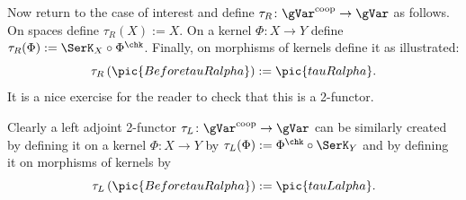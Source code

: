 Now return to the case of interest and define $\tau_R\colon
\gVar^\text{coop}\to \gVar$ as follows.  On spaces define
$\tau_R(X):=X$.  On a kernel $\Phi\colon X\to Y$ define
$\tau_R(\Phi):=\SerK_X\circ \Phi^\chk$.  Finally, on morphisms of
kernels define it as illustrated:
\[\tau_R\left(\pic{BeforetauRalpha}\right):=\pic{tauRalpha}.\]
It is a nice exercise for the reader to check that this is a
2-functor.


Clearly a left adjoint 2-functor $\tau_L\colon \gVar^\text{coop}\to
\gVar$ can be similarly created by defining it on a kernel $\Phi\colon
X\to Y$ by $\tau_L(\Phi):=\Phi^\chk\circ\SerK_Y$ and by defining it on
morphisms of kernels by
\[\tau_L\left(\pic{BeforetauRalpha}\right):=\pic{tauLalpha}.\]
